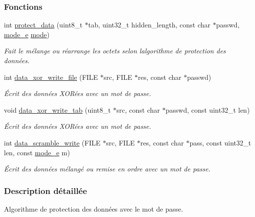 \subsubsection*{Fonctions}
\begin{DoxyCompactItemize}
\item 
int \hyperlink{a00116_a3fd0a8f9ba189acd34f864c97f059b0f}{protect\+\_\+data} (uint8\+\_\+t $\ast$tab, uint32\+\_\+t hidden\+\_\+length, const char $\ast$passwd, \hyperlink{a00008_a3410d2f61b2ebef290660e7d14215bbd}{mode\+\_\+e} \hyperlink{a00008_a1a6b6fb557d8d37d59700faf4e4c9167}{mode})
\begin{DoxyCompactList}\small\item\em Fait le mélange ou réarrange les octets selon l\textquotesingle{}algorithme de protection des données. \end{DoxyCompactList}\item 
\mbox{\label{a00116_aed2bc32539848b035b9ad4fc2efd98e8}} 
int \hyperlink{a00116_aed2bc32539848b035b9ad4fc2efd98e8}{data\+\_\+xor\+\_\+write\+\_\+file} (F\+I\+LE $\ast$src, F\+I\+LE $\ast$res, const char $\ast$passwd)
\begin{DoxyCompactList}\small\item\em Écrit des données X\+O\+Rées avec un mot de passe. \end{DoxyCompactList}\item 
void \hyperlink{a00116_a7a07539cd0f2054ed61e4300f1e9a3d5}{data\+\_\+xor\+\_\+write\+\_\+tab} (uint8\+\_\+t $\ast$src, const char $\ast$passwd, const uint32\+\_\+t len)
\begin{DoxyCompactList}\small\item\em Écrit des données X\+O\+Rées avec un mot de passe. \end{DoxyCompactList}\item 
int \hyperlink{a00116_af1d405b272ef2dc101b959264bad47e1}{data\+\_\+scramble\+\_\+write} (F\+I\+LE $\ast$src, F\+I\+LE $\ast$res, const char $\ast$pass, const uint32\+\_\+t len, const \hyperlink{a00008_a3410d2f61b2ebef290660e7d14215bbd}{mode\+\_\+e} m)
\begin{DoxyCompactList}\small\item\em Écrit des données mélangé ou remise en ordre avec un mot de passe. \end{DoxyCompactList}\end{DoxyCompactItemize}


\subsubsection{Description détaillée}
Algorithme de protection des données avec le mot de passe. 

